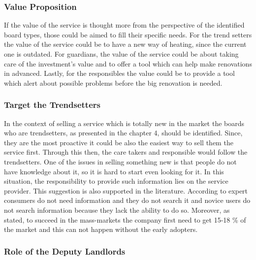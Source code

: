 \subsubsection*{Value Proposition}

If the value of the service is thought more from the perspective of the identified board types, those could be aimed to fill their specific needs. For the trend setters the value of the service could be to have a new way of heating, since the current one is outdated. For guardians, the value of the service could be about taking care of the investment's value and to offer a tool which can help make renovations in advanced. Lastly, for the responsibles the value could be to provide a tool which alert about possible problems before the big renovation is needed.

\subsubsection*{Target the Trendsetters}

In the context of selling a service which is totally new in the market the boards who are trendsetters, as presented in the chapter 4, should be identified. Since, they are the most proactive it could be also the easiest way to sell them the service first. Through this then, the care takers and responsible would follow the trendsetters. One of the issues in selling something new is that people do not have knowledge about it, so it is hard to start even looking for it. In this situation, the responsibility to provide such information lies on the service provider. This suggestion is also supported in the literature. According to \textcite{PurchaseDecisionMaking:2011} expert consumers do not need information and they do not search it and novice users do not search information because they lack the ability to do so. Moreover, as \textcite{Sinek:2009} stated, to succeed in the mass-markets the company first need to get 15-18 \% of the market and this can not happen without the early adopters.

\subsubsection*{Role of the Deputy Landlords}


